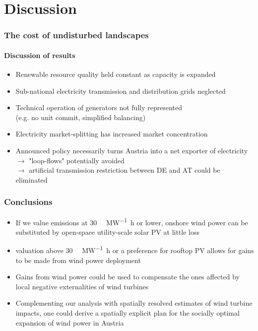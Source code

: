 \documentclass[aspectratio=169, xcolor=dvipsnames]{beamer}
\begin{document}
\section{Discussion}
\begin{frame}
\frametitle{The cost of undisturbed landscapes}
\framesubtitle{Discussion of results}
\begin{itemize}
\item Renewable resource quality held constant as capacity is expanded
\item Sub-national electricity transmission and distribution grids neglected
\item Technical operation of generators not fully represented \\(e.g. no unit commit, simplified balancing)
\item Electricity market-splitting has increased market concentration
\item Announced policy necessarily turns Austria into a net exporter of electricity\\
$\rightarrow$ "loop-flows" potentially avoided \\
$\rightarrow$ artificial transmission restriction between DE and AT could be eliminated
\end{itemize}
\end{frame}


\begin{frame}
\frametitle{Conclusions}
\begin{itemize}
\item If we value  emissions at 30 \SI{}{\text{\euro}\per\mega\watt\hour} or lower, onshore wind power can be substituted by open-space utility-scale solar PV at little loss

\item {} valuation above 30 \SI{}{\text{\euro}\per\mega\watt\hour} or a preference for rooftop PV allows for gains to be made from wind power deployment

\item Gains from wind power could be used to compensate the ones affected by local negative externalities of wind turbines

\item Complementing our analysis with spatially resolved estimates of wind turbine impacts, one could derive a spatially explicit plan for the socially optimal expansion of wind power in Austria
\end{itemize}
\end{frame}
\end{document}
